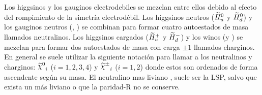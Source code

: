 





Los higgsinos y los gauginos electrodebiles se mezclan entre ellos debido al
efecto del rompimiento de la simetría electrodébil. Los higgsinos neutros
($\widetilde{H}_u^0$ y $\widetilde{H}_d^0$) y los gauginos neutros (\bino, \winozero)
se combinan para formar cuatro autoestados de masa llamados neutralinos.
Los higgsinos cargados ($\widetilde{H}_u^+$ y $\widetilde{H}_d^-$) y los winos
(\winop y \winom) se mezclan para formar dos autoestados de masa con carga
$\pm 1$ llamados charginos.
En general se suele utilizar la siguiente notación para llamar a los
neutralinos y charginos:
${\nino}_{i}$ ($i=1,2,3,4$) y ${\chinopm}_{i}$ ($i=1,2$) donde estos son
ordenados de forma ascendente según su masa. El neutralino mas liviano
{\ninoone}, suele ser la LSP, salvo que exista un {\gravino} más liviano
o que la paridad-R no se conserve.




